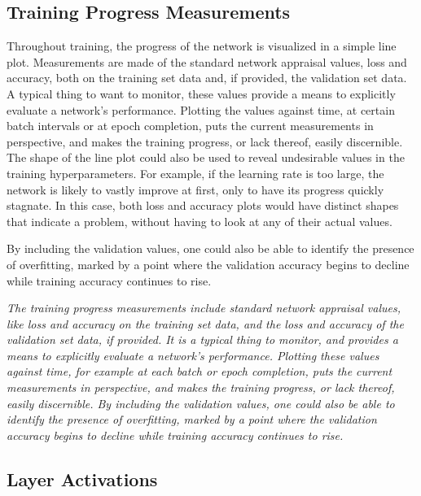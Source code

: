 \subsection{Training Progress Measurements}

Throughout training, the progress of the network is visualized in a simple line plot. Measurements are made of the standard network appraisal values, loss and accuracy, both on the training set data and, if provided, the validation set data. A typical thing to want to monitor, these values provide a means to explicitly evaluate a network’s performance. Plotting the values against time, at certain batch intervals or at epoch completion, puts the current measurements in perspective, and makes the training progress, or lack thereof, easily discernible. The shape of the line plot could also be used to reveal undesirable values in the training hyperparameters. For example, if the learning rate is too large, the network is likely to vastly improve at first, only to have its progress quickly stagnate. In this case, both loss and accuracy plots would have distinct shapes that indicate a problem, without having to look at any of their actual values.

By including the validation values, one could also be able to identify the presence of overfitting, marked by a point where the validation accuracy begins to decline while training accuracy continues to rise.

\textit{The training progress measurements include standard network appraisal values, like loss and accuracy on the training set data, and the loss and accuracy of the validation set data, if provided. It is a typical thing to monitor, and provides a means to explicitly evaluate a network’s performance. Plotting these values against time, for example at each batch or epoch completion, puts the current measurements in perspective, and makes the training progress, or lack thereof, easily discernible. By including the validation values, one could also be able to identify the presence of overfitting, marked by a point where the validation accuracy begins to decline while training accuracy continues to rise.}

\subsection{Layer Activations}

